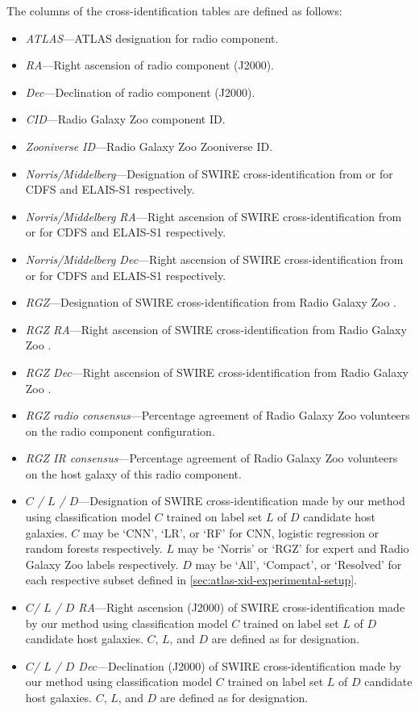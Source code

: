   The columns of the cross-identification tables are defined as follows:
  \begin{itemize}
    \item \emph{ATLAS}---ATLAS designation for radio component.
    \item \emph{RA}---Right ascension of radio component (J2000).
    \item \emph{Dec}---Declination of radio component (J2000).
    \item \emph{CID}---Radio Galaxy Zoo component ID.
    \item \emph{Zooniverse ID}---Radio Galaxy Zoo Zooniverse ID.
    \item \emph{Norris/Middelberg}---Designation of SWIRE cross-identification from \citet{norris06} or \citet{middelberg08} for CDFS and ELAIS-S1 respectively.
    \item \emph{Norris/Middelberg RA}---Right ascension of SWIRE cross-identification from \citet{norris06} or \citet{middelberg08} for CDFS and ELAIS-S1 respectively.
    \item \emph{Norris/Middelberg Dec}---Right ascension of SWIRE cross-identification from \citet{norris06} or \citet{middelberg08} for CDFS and ELAIS-S1 respectively.
    \item \emph{RGZ}---Designation of SWIRE cross-identification from Radio Galaxy Zoo \citep{wong21rgz}.
    \item \emph{RGZ RA}---Right ascension of SWIRE cross-identification from Radio Galaxy Zoo \citep{wong21rgz}.
    \item \emph{RGZ Dec}---Right ascension of SWIRE cross-identification from Radio Galaxy Zoo \citep{wong21rgz}.
    \item \emph{RGZ radio consensus}---Percentage agreement of Radio Galaxy Zoo volunteers on the radio component configuration.
    \item \emph{RGZ IR consensus}---Percentage agreement of Radio Galaxy Zoo volunteers on the host galaxy of this radio component.
    \item \emph{$C$ / $L$ / $D$}---Designation of SWIRE cross-identification made by our method using classification model $C$ trained on label set $L$ of $D$ candidate host galaxies. $C$ may be `CNN', `LR', or `RF' for CNN, logistic regression or random forests respectively. $L$ may be `Norris' or `RGZ' for expert and Radio Galaxy Zoo labels respectively. $D$ may be `All', `Compact', or `Resolved' for each respective subset defined in \autoref{sec:atlas-xid-experimental-setup}.
    \item \emph{$C$/ $L$ / $D$ RA}---Right ascension (J2000) of SWIRE cross-identification made by our method using classification model $C$ trained on label set $L$ of $D$ candidate host galaxies. $C$, $L$, and $D$ are defined as for designation.
    \item \emph{$C$/ $L$ / $D$ Dec}---Declination (J2000) of SWIRE cross-identification made by our method using classification model $C$ trained on label set $L$ of $D$ candidate host galaxies. $C$, $L$, and $D$ are defined as for designation.
  \end{itemize}

